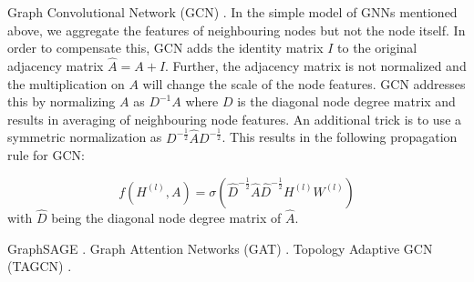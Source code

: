 Graph Convolutional Network (GCN) \cite{Kipf2016tc}. In the simple model of GNNs mentioned above, we aggregate the features of neighbouring nodes but not the node itself.
In order to compensate this, GCN adds the identity matrix $I$ to the original adjacency matrix $\hat{A} = A + I$.
Further, the adjacency matrix is not normalized and the multiplication on $A$ will change the scale of the node features.
GCN addresses this by normalizing $A$ as $D^{-1}A$ where $D$ is the diagonal node degree matrix and results in averaging of neighbouring node features.
An additional trick is to use a symmetric normalization as $D^{-\frac{1}{2}}\hat{A}D^{-\frac{1}{2}}$. This results in the following propagation rule for GCN:

\begin{equation}
f(H^{(l)}, A) = \sigma\left( \hat{D}^{-\frac{1}{2}}\hat{A}\hat{D}^{-\frac{1}{2}}H^{(l)}W^{(l)}\right)
\end{equation}
with $\hat{D}$ being the diagonal node degree matrix of $\hat{A}$.

GraphSAGE \cite{NIPS20176703}.
Graph Attention Networks (GAT) \cite{velickovic2018graph}.
Topology Adaptive GCN (TAGCN) \cite{du2018topology}.
